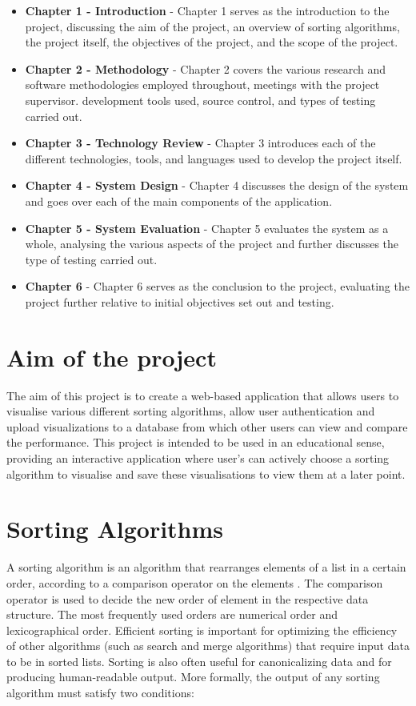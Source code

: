 \begin{itemize}
    \item \textbf{Chapter 1 - Introduction} - Chapter 1 serves as the introduction to the project, discussing the aim of the project, an overview of sorting algorithms, the project itself, the objectives of the project, and the scope of the project.
    \item \textbf{Chapter 2 - Methodology} - Chapter 2 covers the various research and software methodologies employed throughout, meetings with the project supervisor. development tools used, source control, and types of testing carried out.
    \item \textbf{Chapter 3 - Technology Review} - Chapter 3 introduces each of the different technologies, tools, and languages used to develop the project itself.
    \item \textbf{Chapter 4 - System Design} - Chapter 4 discusses the design of the system and goes over each of the main components of the application.
    \item \textbf{Chapter 5 - System Evaluation} - Chapter 5 evaluates the system as a whole, analysing the various aspects of the project and further discusses the type of testing carried out.
    \item \textbf{Chapter 6} - Chapter 6 serves as the conclusion to the project, evaluating the project further relative to initial objectives set out and testing.
\end{itemize}

\section{Aim of the project}
The aim of this project is to create a web-based application that allows users to
visualise various different sorting algorithms, allow user authentication and 
upload visualizations to a database from which other users can view and compare
the performance. This project is intended to be used in an educational sense,
providing an interactive application where user's can actively choose a sorting
algorithm to visualise and save these visualisations to view them at a later point.

\section{Sorting Algorithms}
A sorting algorithm is an algorithm that rearranges 
elements of a list in a certain order, according to a comparison operator on the
elements \cite{sorting_algs_wiki}. The comparison operator is used to decide the new order of element in the respective data structure. The most frequently used orders are numerical order and lexicographical order. Efficient sorting is important for optimizing the efficiency of other algorithms (such as search and merge algorithms) that require input data to be in sorted lists. Sorting is also often useful for canonicalizing data and for producing human-readable output. More formally, the output of any sorting algorithm must satisfy two conditions:

